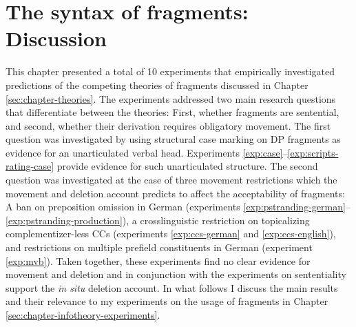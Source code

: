 \section{The syntax of fragments: Discussion}\label{sec:syntax-gdiscussion}
This chapter presented a total of 10 experiments that empirically investigated predictions of the competing theories of fragments discussed in Chapter \ref{sec:chapter-theories}. The experiments addressed two main research questions that differentiate between the theories: First, whether fragments are sentential, and second, whether their derivation requires obligatory movement. The first question was investigated by using structural case marking on DP fragments as evidence for an unarticulated verbal head. Experiments \ref{exp:case}--\ref{exp:scripts-rating-case} provide evidence for such unarticulated structure. The second question was investigated at the case of three movement restrictions which the movement and deletion account predicts to affect the acceptability of fragments: A ban on preposition omission in German (experiments \ref{exp:pstranding-german}--\ref{exp:pstranding-production}), a crosslinguistic restriction on topicalizing complementizer-less CCs (experiments \ref{exp:ccs-german} and \ref{exp:ccs-english}), and restrictions on multiple prefield constituents in German (experiment \ref{exp:mvb}). Taken together, these experiments find no clear evidence for movement and deletion and in conjunction with the experiments on sententiality support the \textit{in situ} deletion account. In what follows I  discuss the main results and their relevance to my experiments on the usage of fragments in Chapter \ref{sec:chapter-infotheory-experiments}.


